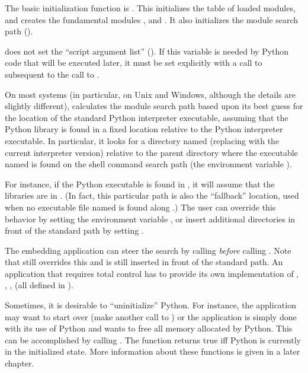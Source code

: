\documentclass[twoside]{report}
\begin{document}
The basic initialization function is .  This 
initializes the table of loaded modules, and creates the fundamental 
modules ,  and .  It also 
initializes the module search path ().

 does not set the ``script argument list'' 
().  If this variable is needed by Python code that 
will be executed later, it must be set explicitly with a call to 
 subsequent to the call 
to .

On most systems (in particular, on Unix and Windows, although the
details are slightly different),  calculates the
module search path based upon its best guess for the location of the
standard Python interpreter executable, assuming that the Python
library is found in a fixed location relative to the Python
interpreter executable.  In particular, it looks for a directory named
 (replacing  with the current
interpreter version) relative to the parent directory where the
executable named  is found on the shell command search
path (the environment variable ).

For instance, if the Python executable is found in
, it will assume that the libraries are in
.  (In fact, this particular path is
also the ``fallback'' location, used when no executable file named
 is found along .)  The user can override
this behavior by setting the environment variable ,
or insert additional directories in front of the standard path by
setting .

The embedding application can steer the search by calling 
 \emph{before} calling 
.  Note that  still overrides 
this and  is still inserted in front of the 
standard path.  An application that requires total control has to
provide its own implementation of ,
, ,
 (all defined in
).

Sometimes, it is desirable to ``uninitialize'' Python.  For instance, 
the application may want to start over (make another call to 
) or the application is simply done with its 
use of Python and wants to free all memory allocated by Python.  This
can be accomplished by calling .  The function
 returns true iff Python is currently in the
initialized state.  More information about these functions is given in
a later chapter.
\end{document}
